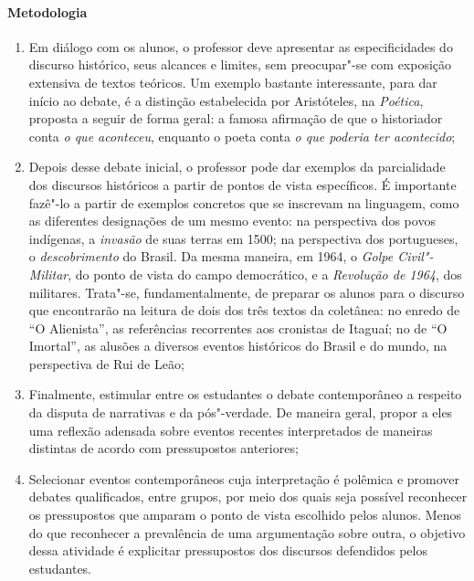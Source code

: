 \documentclass{extarticle}
\begin{document}
\paragraph{Metodologia}
\begin{enumerate}
\item Em diálogo com os alunos, o professor deve apresentar as
especificidades do discurso histórico, seus alcances e limites, sem
preocupar"-se com exposição extensiva de textos teóricos. Um exemplo
bastante interessante, para dar início ao debate, é a distinção
estabelecida por Aristóteles, na \emph{Poética}, proposta a seguir de
forma geral: a famosa afirmação de que o historiador conta \emph{o que
aconteceu}, enquanto o poeta conta \emph{o que poderia ter acontecido};


\item Depois desse debate inicial, o professor pode dar exemplos da
parcialidade dos discursos históricos a partir de pontos de vista
específicos. É importante fazê"-lo a partir de exemplos concretos que se
inscrevam na linguagem, como as diferentes designações de um mesmo
evento: na perspectiva dos povos indígenas, a \emph{invasão} de suas
terras em 1500; na perspectiva dos portugueses, o \emph{descobrimento}
do Brasil. Da mesma maneira, em 1964, o \emph{Golpe Civil"-Militar}, do
ponto de vista do campo democrático, e a \emph{Revolução de 1964}, dos
militares. Trata"-se, fundamentalmente, de preparar os alunos para o
discurso que encontrarão na leitura de dois dos três textos da
coletânea: no enredo de ``O Alienista'', as referências recorrentes aos
cronistas de Itaguaí; no de ``O Imortal'', as alusões a diversos eventos
históricos do Brasil e do mundo, na perspectiva de Rui de Leão;

\item Finalmente, estimular entre os estudantes o debate contemporâneo a
respeito da disputa de narrativas e da pós"-verdade. De maneira geral,
propor a eles uma reflexão adensada sobre eventos recentes interpretados
de maneiras distintas de acordo com pressupostos anteriores;

\item Selecionar eventos contemporâneos cuja interpretação é polêmica e
promover debates qualificados, entre grupos, por meio dos quais seja
possível reconhecer os pressupostos que amparam o ponto de vista
escolhido pelos alunos. Menos do que reconhecer a prevalência de uma
argumentação sobre outra, o objetivo dessa atividade é explicitar
pressupostos dos discursos defendidos pelos estudantes.
\end{enumerate}
\end{document}
